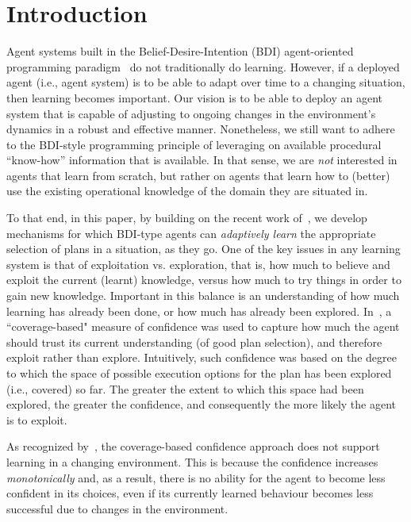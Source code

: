 \section{Introduction}\label{sec:introduction}

Agent systems built in the Belief-Desire-Intention (BDI) agent-oriented programming paradigm~\cite{Georgeff89-PRS,Rao96:AgentSpeak,WooldridgeBook} do not traditionally do learning. 
However, if a deployed agent (i.e., agent system) is to be able to adapt over time to a changing situation, then learning becomes important. Our vision is to be able to deploy an agent system that is capable of adjusting to ongoing changes in the environment's dynamics in a robust and effective manner. Nonetheless, we still want to adhere to the BDI-style programming principle of leveraging on available procedural ``know-how'' information that is available. In that sense, we are \emph{not} interested in agents that learn from scratch, but rather on agents that learn how to (better) use the existing operational knowledge of the domain they are situated in. 



To that end, in this paper, by building on the recent work of~\cite{airiau09:enhancing,singh10:extending,singh10:learning}, we develop mechanisms for which BDI-type agents can \emph{adaptively learn} the appropriate selection of plans in a situation, as they go. 
One of the key issues in any learning system is that of exploitation vs. exploration, that is, how much to believe and exploit the current (learnt) knowledge, versus how much to try things in order to gain new knowledge. Important in this balance is an understanding of how much learning has already been done, or how much has already been explored. In~\cite{singh10:extending,singh10:learning}, a ``coverage-based" measure of confidence was used to capture how much the agent should trust its current understanding (of good plan selection), and therefore exploit rather than explore. Intuitively, such confidence was based on the degree to which the space of possible execution options for the plan has been explored (i.e., covered) so far. The greater the extent to which this space had been explored, the greater the confidence, and consequently the more likely the agent is to exploit.  

As recognized by~\cite{singh10:learning}, the coverage-based confidence approach does not support learning in a changing environment. This is because the confidence increases \emph{monotonically} and, as a result, there is no ability for the agent to become less confident in its choices, even if its currently learned behaviour becomes less successful due to changes in the environment.



